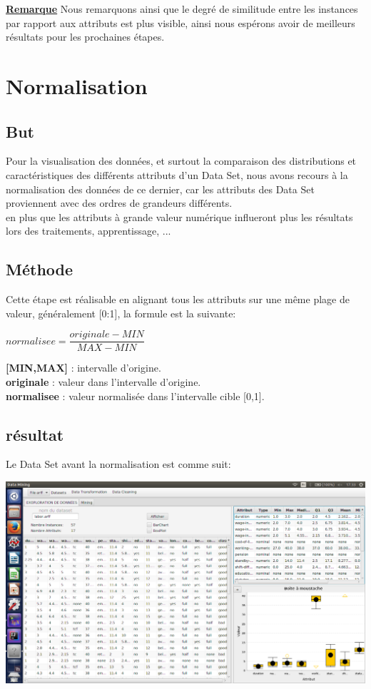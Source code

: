 \documentclass[12pt,a4paper,oneside]{book}
\begin{document}
	\underline{\textbf{Remarque}}
	Nous remarquons ainsi que le degré de similitude entre les instances par rapport aux attributs est plus visible, ainsi nous espérons avoir de meilleurs résultats pour les prochaines étapes.
	
	
	
	\section{Normalisation}
	\subsection{But}
	
	Pour la visualisation des données, et surtout la comparaison des distributions et caractéristiques des différents attributs d'un Data Set, nous avons recours à la normalisation des données de ce dernier, car les attributs des Data Set proviennent avec des ordres de grandeurs différents.\\
	
	en plus que les attributs à grande valeur numérique influeront plus les résultats lors des traitements, apprentissage, ...
	
	\subsection{Méthode}
	Cette étape est réalisable en alignant tous les attributs sur une même plage de valeur, généralement [0:1], la formule est la suivante:
	\begin{center}
		$normalisee = \dfrac{originale - MIN}{MAX - MIN}$
	\end{center}
	\textbf{[MIN,MAX]} : intervalle d'origine.\\
	\textbf{originale} : valeur dans l'intervalle d'origine.\\
	\textbf{normalisee} : valeur normalisée dans l'intervalle cible [0,1].\\
	
	
	
	
	\subsection{résultat}
	Le Data Set avant la normalisation est comme suit: 
	\begin{center}
		\includegraphics[width=1\textwidth]{screens/avantDiscr.png}%
		\label{labelname}%
	\end{center}
	
\end{document}
